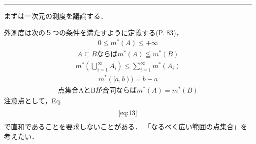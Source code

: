 \documentclass[letterpaper,10pt,english]{sphinxmanual}
\begin{document}
\bigskip\hrule\bigskip


\sphinxAtStartPar
まずは一次元の測度を議論する．

\sphinxAtStartPar
外測度は次の５つの条件を満たすように定義する(P. 83)，
\begin{equation*}
\begin{split}\begin{equation}
0 \leq m^{\ast}(A) \leq +\infty
\label{eq:11}\tag{C1}
\end{equation}\end{split}
\end{equation*}\begin{equation*}
\begin{split}\begin{equation}
A \subseteq B \text{ならば} m^{\ast}(A) \leqq m^{\ast}(B)
\label{eq:12}\tag{C2}
\end{equation}\end{split}
\end{equation*}\begin{equation*}
\begin{split}\begin{equation}
m^{\ast}\left(\bigcup_{i=1}^{\infty} A_{i}\right) \leq \sum_{i=1}^{\infty} m^{\ast}\left(A_{i}\right)
\label{eq:13}\tag{C3}
\end{equation}\end{split}
\end{equation*}\begin{equation*}
\begin{split}\begin{equation}
m^{\ast}([a,b)) = b-a
\label{eq:14}\tag{C4}
\end{equation}\end{split}
\end{equation*}\begin{equation*}
\begin{split}\begin{equation}
\text{点集合AとBが合同ならば} m^{\ast}(A) = m^{\ast}(B)
\label{eq:15}\tag{C5}
\end{equation}\end{split}
\end{equation*}
\sphinxAtStartPar
注意点として，Eq.
\begin{equation*}
\begin{split}\eqref{eq:13}\end{split}
\end{equation*}
\sphinxAtStartPar
で直和であることを要求しないことがある．
「なるべく広い範囲の点集合」を考えたい．
\end{document}
